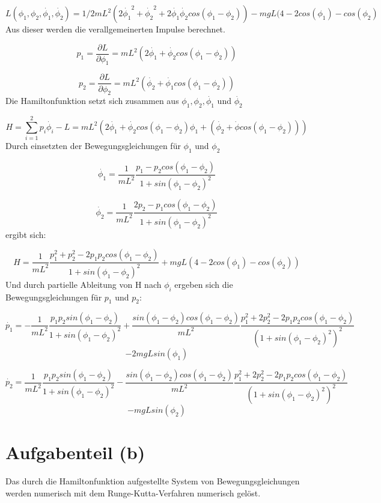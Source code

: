 \documentclass{scrreprt}
\begin{document}
\[L(\phi_1,\phi_2,\dot{\phi_1},\dot{\phi_2}) = 1/2 m L^2 (2 \dot{\phi_1}^2 + \dot{\phi_2}^2 + 2 \dot{\phi_1}\dot{\phi_2} cos(\phi_1 - \phi_2)) - m g L(4-2 cos(\phi_1)-cos(\phi_2)\]
Aus dieser werden die verallgemeinerten Impulse berechnet.

\[p_1 = \frac{\partial L}{\partial\phi_1} = m L^2 (2\dot{\phi_1}+\dot{\phi_2} cos(\phi_1 - \phi_2))\] 

\[p_2 = \frac{\partial L}{\partial \phi_2} = m L^2(\dot{\phi_2}+ \dot{\phi_1}cos(\phi_1-\phi_2))\]
Die Hamiltonfunktion setzt sich zusammen aus $\phi_1, \phi_2, \dot{\phi_1}$ und $\dot{\phi_2}$

\[H = \sum_{i=1}^{2} p_i \dot{\phi_i} - L = m L^2 (2 \dot{\phi_1} + \dot{\phi_2} cos(\phi_1-\phi_2)\phi_1 + (\dot{\phi_2}+\dot{\phi} cos(\phi_1 - \phi_2)))\]
Durch einsetzten der Bewegungsgleichungen für $\phi_1$ und $\phi_2$

\[\dot{\phi_1}=\frac{1}{m L^2}\frac{p_1-p_2cos(\phi_1-\phi_2)}{1+sin(\phi_1-\phi_2)^2}\] 	

\[\dot{\phi_2}=\frac{1}{m L^2}\frac{2 p_2 - p_1 cos(\phi_1 - \phi_2)}{1+sin(\phi_1-\phi_2)^2}\]
ergibt sich:

\[H = \frac{1}{m L^2}\frac{p_1^2+p_2^2-2 p_1 p_2 cos(\phi_1-\phi_2)}{1+sin(\phi_1-\phi_2)^2}+m g L (4-2cos(\phi_1)-cos(\phi_2))\]
Und durch partielle Ableitung von H nach $\phi_i$ ergeben sich die Bewegungsgleichungen für $p_1$ und $p_2$:

\[\dot{p_1} = -\frac{1}{m L^2}\frac{p_1 p_2 sin(\phi_1-\phi_2)}{1+sin(\phi_1-\phi_2)^2}+\frac{sin(\phi_1-\phi_2) cos(\phi_1-\phi_2) }{m L^2}\frac{p_1^2+2 p_2^2-2 p_1 p_2 cos(\phi_1-\phi_2)}{(1+sin(\phi_1-\phi_2)^2)^2}\]\[-2 m g L sin(\phi_1)\]

\[\dot{p_2}=\frac{1}{m L^2}\frac{p_1 p_2 sin(\phi_1-\phi_2)}{1+sin(\phi_1-\phi_2)^2}-\frac{sin(\phi_1-\phi_2)cos(\phi_1-\phi_2)}{m L^2}\frac{p_1^2 + 2 p_2^2 - 2 p_1 p_2 cos(\phi_1-\phi_2)}{(1+sin(\phi_1-\phi_2)^2)^2}\]\[- m g L sin(\phi_2)\]

\section*{Aufgabenteil (b)}
Das durch die Hamiltonfunktion aufgestellte System von Bewegungsgleichungen werden numerisch mit dem Runge-Kutta-Verfahren numerisch gelöst.
\end{document}
